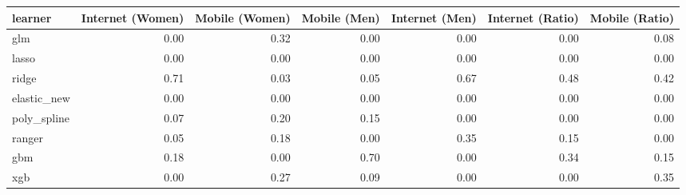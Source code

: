 \begin{table}[ht]
\centering
\begin{tabular}{lrrrrrr}
  \toprule
learner & Internet (Women) & Mobile (Women) & Mobile (Men) & Internet (Men) & Internet (Ratio) & Mobile (Ratio) \\ 
  \midrule
glm & 0.00 & 0.32 & 0.00 & 0.00 & 0.00 & 0.08 \\ 
  lasso & 0.00 & 0.00 & 0.00 & 0.00 & 0.00 & 0.00 \\ 
  ridge & 0.71 & 0.03 & 0.05 & 0.67 & 0.48 & 0.42 \\ 
  elastic\_new & 0.00 & 0.00 & 0.00 & 0.00 & 0.00 & 0.00 \\ 
  poly\_spline & 0.07 & 0.20 & 0.15 & 0.00 & 0.00 & 0.00 \\ 
  ranger & 0.05 & 0.18 & 0.00 & 0.35 & 0.15 & 0.00 \\ 
  gbm & 0.18 & 0.00 & 0.70 & 0.00 & 0.34 & 0.15 \\ 
  xgb & 0.00 & 0.27 & 0.09 & 0.00 & 0.00 & 0.35 \\ 
   \bottomrule
\end{tabular}
\end{table}
